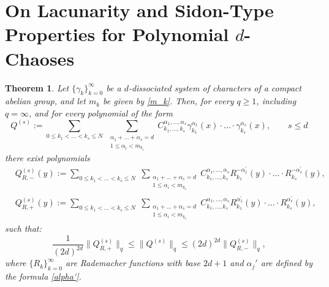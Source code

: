 \documentclass[12pt]{article}
\newtheorem{theorem}{Theorem}  %
\begin{document}
	\section{On Lacunarity and Sidon-Type Properties \newline
		 for Polynomial $d$-Chaoses} \label{section-3}
	\begin{theorem} \label{th-0}
Let $\{\gamma_{k}\}_{k=0}^{\infty}$ be a $d$-dissociated system of characters of a compact abelian group, and let $m_k$ be given by \eqref{m_k}. Then, for every $q \ge 1$, including $q = \infty$, and for every polynomial of the form
		\[
		Q^{(s)} := \sum_{0\le k_1 < \ldots < k_s \le N} \; \sum_{\substack{\alpha_1+\ldots+\alpha_s = d \\ 1 \le \alpha_i < m_{k_i}}} C_{k_1, \ldots, k_s}^{\alpha_1, \ldots, \alpha_s} \gamma_{k_1}^{\alpha_1}(x) \cdot \ldots \cdot \gamma_{k_s}^{\alpha_s}(x), \qquad s \le d
		\]
		there exist polynomials 
		\begin{equation} \label{Q-s_R}
			\begin{split}
				& Q^{(s)}_{R, -}(y) := \sum_{0\le k_1 < \ldots < k_s \le N} \; \sum_{\substack{\alpha_1+\ldots+\alpha_s = d \\ 1 \le \alpha_i < m_{k_i}}} C_{k_1, \ldots, k_s}^{\alpha_1, \ldots, \alpha_s} R_{k_1}^{-\alpha^{\prime}_1}(y) \cdot \ldots \cdot R_{k_s}^{-\alpha^{\prime}_s}(y), \\
				& Q^{(s)}_{R, +}(y) := \sum_{0\le k_1 < \ldots < k_s \le N} \; \sum_{\substack{\alpha_1+\ldots+\alpha_s = d \\ 1 \le \alpha_i < m_{k_i}}} C_{k_1, \ldots, k_s}^{\alpha_1, \ldots, \alpha_s} R_{k_1}^{\alpha^{\prime}_1}(y) \cdot \ldots \cdot R_{k_s}^{\alpha^{\prime}_s}(y),
			\end{split}
		\end{equation}
		such that:
		\begin{equation} \label{th-0-main}
			\frac{1}{(2d)^{2d}} \|Q^{(s)}_{R, +}\|_q	\le \|Q^{(s)}\|_q \le (2d)^{2d} \|Q^{(s)}_{R, -}\|_q,
		\end{equation}
		where $\{R_{k}\}_{k=0}^{\infty}$ are Rademacher functions with base $2d+1$ and $\alpha_j'$ are defined by the formula \eqref{alpha'}.
	\end{theorem}
\end{document}
